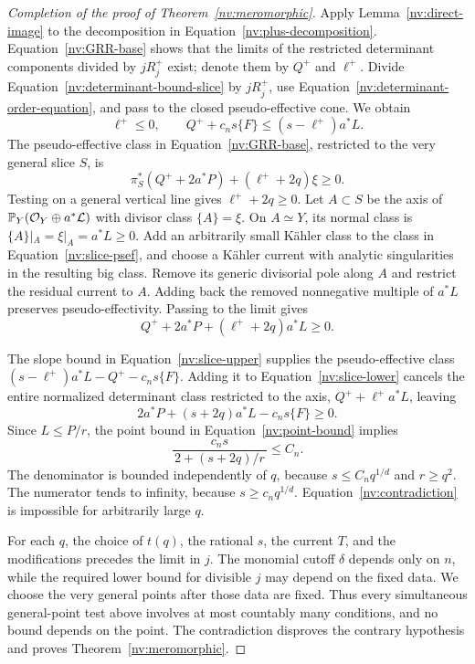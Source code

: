 \begin{proof}[Completion of the proof of Theorem~\ref{nv:meromorphic}]
Apply Lemma~\ref{nv:direct-image} to the decomposition in
Equation~\eqref{nv:plus-decomposition}.  Equation~\eqref{nv:GRR-base}
shows that the limits of the restricted determinant components divided by
\(jR_j^+\) exist; denote them by \(Q^+\) and \(\ell^+\).  Divide
Equation~\eqref{nv:determinant-bound-slice} by \(jR_j^+\), use
Equation~\eqref{nv:determinant-order-equation}, and pass to the closed
pseudo-effective cone.  We obtain
\begin{equation}\label{nv:slice-upper}
 \ell^+\le0,\qquad
 Q^++c_ns\{F\}\le(s-\ell^+)a^*L.
\end{equation}
The pseudo-effective class in Equation~\eqref{nv:GRR-base}, restricted to the
very general slice \(S\), is
\begin{equation}\label{nv:slice-psef}
 \pi_S^*(Q^++2a^*P)+(\ell^++2q)\xi\ge0.
\end{equation}
Testing on a general vertical line gives \(\ell^++2q\ge0\).
Let \(A\subset S\) be the axis of
\(\mathbb P_Y(\mathcal O_Y\oplus a^*\mathcal{L})\) with divisor class \(\{A\}=\xi\).
On \(A\simeq Y\), its normal class is \(\{A\}|_A=\xi|_A=a^*L\ge0\).
Add an arbitrarily small Kähler class to the class in
Equation~\eqref{nv:slice-psef}, and choose a Kähler current with analytic
singularities in the resulting big class.  Remove its generic divisorial
pole along \(A\) and restrict
the residual current to \(A\).  Adding back the removed nonnegative multiple
of \(a^*L\) preserves pseudo-effectivity.  Passing to the limit gives
\begin{equation}\label{nv:slice-lower}
 Q^++2a^*P+(\ell^++2q)a^*L\ge0.
\end{equation}

The slope bound in Equation~\eqref{nv:slice-upper} supplies the
pseudo-effective class \((s-\ell^+)a^*L-Q^+-c_ns\{F\}\).  Adding it to
Equation~\eqref{nv:slice-lower} cancels the entire normalized determinant
class restricted to the axis, \(Q^++\ell^+a^*L\), leaving
\[
 2a^*P+(s+2q)a^*L-c_ns\{F\}\ge0.
\]
Since \(L\le P/r\), the point bound in Equation~\eqref{nv:point-bound} implies
\begin{equation}\label{nv:contradiction}
 \frac{c_ns}{\,2+(s+2q)/r\,}\le C_n.
\end{equation}
The denominator is bounded independently of \(q\), because
\(s\le C_nq^{1/d}\) and \(r\ge q^2\).  The numerator tends to
infinity, because \(s\ge c_nq^{1/d}\).  Equation~\eqref{nv:contradiction}
is impossible for arbitrarily large \(q\).

For each \(q\), the choice of \(t(q)\), the rational \(s\), the current
\(T\), and the modifications precedes the limit in \(j\).  The monomial
cutoff \(\delta\) depends only on \(n\), while the required lower bound for
divisible \(j\) may depend on the fixed data.  We choose the very general
points after those data are fixed.
Thus every simultaneous general-point test above involves at most
countably many conditions, and no bound depends on the point.
The contradiction disproves the contrary hypothesis and proves
Theorem~\ref{nv:meromorphic}.
\end{proof}
